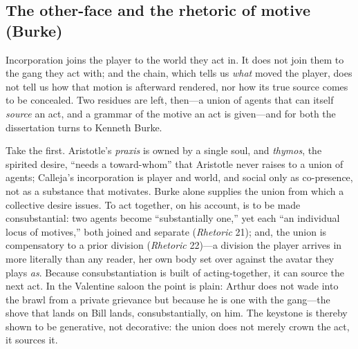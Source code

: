 \documentclass{article}
\begin{document}
\subsection{The other-face and the rhetoric of motive (Burke)}

Incorporation joins the player to the world they act in. It does not join them to the gang they act with; and the chain, which tells us \textit{what} moved the player, does not tell us how that motion is afterward rendered, nor how its true source comes to be concealed. Two residues are left, then---a union of agents that can itself \textit{source} an act, and a grammar of the motive an act is given---and for both the dissertation turns to Kenneth Burke.

Take the first. Aristotle's \textit{praxis} is owned by a single soul, and \textit{thymos}, the spirited desire, ``needs a toward-whom'' that Aristotle never raises to a union of agents; Calleja's incorporation is player and world, and social only as co-presence, not as a substance that motivates. Burke alone supplies the union from which a collective desire issues. To act together, on his account, is to be made consubstantial: two agents become ``substantially one,'' yet each ``an individual locus of motives,'' both joined and separate (\textit{Rhetoric} 21); and, the union is compensatory to a prior division (\textit{Rhetoric} 22)---a division the player arrives in more literally than any reader, her own body set over against the avatar they plays \textit{as}. Because consubstantiation is built of acting-together, it can source the next act. In the Valentine saloon the point is plain: Arthur does not wade into the brawl from a private grievance but because he is one with the gang---the shove that lands on Bill lands, consubstantially, on him. The keystone is thereby shown to be generative, not decorative: the union does not merely crown the act, it sources it.
\end{document}
